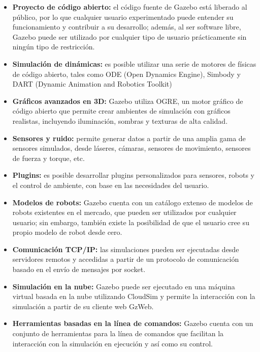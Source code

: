 \begin{itemize}
    \item \textbf{Proyecto de código abierto:} el código fuente de Gazebo está liberado al público, por lo que cualquier usuario experimentado puede entender su funcionamiento y contribuir a su desarrollo; además, al ser software libre, Gazebo puede ser utilizado por cualquier tipo de usuario prácticamente sin ningún tipo de restricción. 
    \item \textbf{Simulación de dinámicas:} es posible utilizar una serie de motores de físicas de código abierto, tales como ODE (Open Dynamics Engine), Simbody y DART (Dynamic Animation and Robotics Toolkit)
    \item \textbf{Gráficos avanzados en 3D:} Gazebo utiliza OGRE, un motor gráfico de código abierto que permite crear ambientes de simulación con gráficos realistas, incluyendo iluminación, sombras y texturas de alta calidad.
    \item \textbf{Sensores y ruido:} permite generar datos a partir de una amplia gama de sensores simulados, desde láseres, cámaras, sensores de movimiento, sensores de fuerza y torque, etc.
    \item \textbf{Plugins:} es posible desarrollar plugins personalizados para sensores, robots y el control de ambiente, con base en las necesidades del usuario. 
    \item \textbf{Modelos de robots:} Gazebo cuenta con un catálogo extenso de modelos de robots existentes en el mercado, que pueden ser utilizados por cualquier usuario; sin embargo, también existe la posibilidad de que el usuario cree su propio modelo de robot desde cero. 
    \item \textbf{Comunicación TCP/IP:} las simulaciones pueden ser ejecutadas desde servidores remotos y accedidas a partir de un protocolo de comunicación basado en el envío de mensajes por socket.
    \item \textbf{Simulación en la nube:} Gazebo puede ser ejecutado en una máquina virtual basada en la nube utilizando CloudSim y permite la interacción con la simulación a partir de su cliente web GzWeb.
    \item \textbf{Herramientas basadas en la línea de comandos:} Gazebo cuenta con un conjunto de herramientas para la línea de comandos que facilitan la interacción con la simulación en ejecución y así como su control.
\end{itemize}
